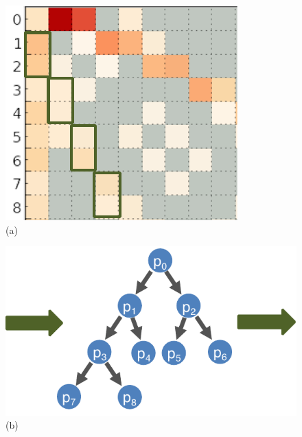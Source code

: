 \begin{figure}
\begin{minipage}[b]{0.33\linewidth}
        \includegraphics[width=0.9\linewidth]{chapter_4_figures/partial_heatmap_total_scatter}
        \\ (a) \\
    \end{minipage}%
    \begin{minipage}[b]{0.33\linewidth}
        \centering
        \includegraphics[width=\linewidth]{chapter_4_figures/comm_pattern_scatter}
        \\ (b) \\
    \end{minipage}%
    \begin{minipage}[b]{0.33\linewidth}
        \centering

\end{minipage}
\end{figure}
